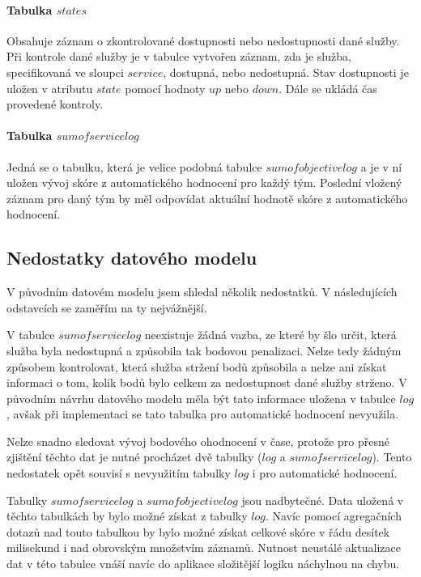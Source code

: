 \documentclass[
  digital,
  twoside,
  table, 
  nolof, 
  nolot
]{fithesis3}
\begin{document}
\paragraph{Tabulka $states$} Obsahuje záznam o zkontrolované dostupnosti nebo nedostupnosti dané služby. Při kontrole dané služby je v tabulce vytvořen záznam, zda je služba, specifikovaná ve sloupci $service$, dostupná, nebo nedostupná. Stav dostupnosti je uložen v atributu $state$ pomocí hodnoty $up$ nebo $down$. Dále se ukládá čas provedené kontroly.

\paragraph{Tabulka $sumofservicelog$} Jedná se o tabulku, která je velice podobná tabulce $sumofobjectivelog$ a je v ní uložen vývoj skóre z automatického hodnocení pro každý tým. Poslední vložený záznam pro daný tým by měl odpovídat aktuální hodnotě skóre z automatického hodnocení.

\subsection{Nedostatky datového modelu}

V původním datovém modelu jsem shledal několik nedostatků. V následujících odstavcích se zaměřím na ty nejvážnější.

V tabulce $sumofservicelog$ neexistuje žádná vazba, ze které by šlo určit, která služba byla nedostupná a způsobila tak bodovou penalizaci. Nelze tedy žádným způsobem kontrolovat, která služba stržení bodů způsobila a nelze ani získat informaci o tom, kolik bodů bylo celkem za nedostupnost dané služby strženo. V původním návrhu datového modelu měla být tato informace uložena v tabulce $log$, avšak při implementaci se tato tabulka pro automatické hodnocení nevyužila. 

Nelze snadno sledovat vývoj bodového ohodnocení v čase, protože pro přesné zjištění těchto dat je nutné procházet dvě tabulky ($log$ a $sumofservicelog$). Tento nedostatek opět souvisí s nevyužitím tabulky $log$ i pro automatické hodnocení.

Tabulky $sumofservicelog$ a $sumofobjectivelog$ jsou nadbytečné. Data uložená v těchto tabulkách by bylo možné získat z tabulky $log$. Navíc pomocí agregačních dotazů nad touto tabulkou by bylo možné získat celkové skóre v řádu desítek milisekund i nad obrovským množstvím záznamů. Nutnost neustálé aktualizace dat v této tabulce vnáší navíc do aplikace složitější logiku náchylnou na chybu. 
\end{document}
